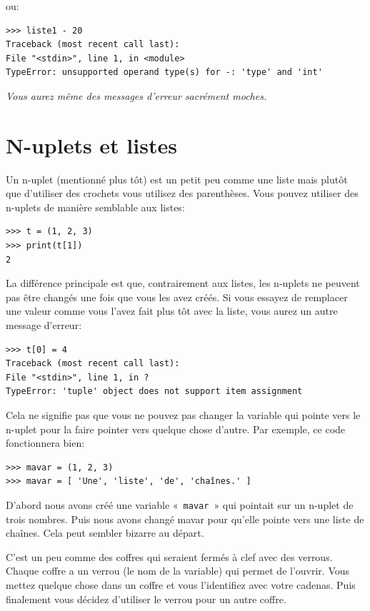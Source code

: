 ou:

\begin{Verbatim}[frame=single,rulecolor=\color{red}, label=erreur]
>>> liste1 - 20
Traceback (most recent call last):
File "<stdin>", line 1, in <module>
TypeError: unsupported operand type(s) for -: 'type' and 'int'
\end{Verbatim}

\emph{Vous aurez même des messages d'erreur sacrément moches.}

\section{N-uplets et listes\label{sec:nuplets}}
Un n-uplet (mentionné plus tôt) est un petit peu comme une liste mais plutôt que d'utiliser des crochets vous utilisez des parenthèses. Vous pouvez utiliser des n-uplets de manière semblable aux listes:

\begin{Verbatim}[frame=single,rulecolor=\color{mbleu}, label=à taper]
>>> t = (1, 2, 3)
>>> print(t[1])
2
\end{Verbatim}

La différence principale est que, contrairement aux listes, les n-uplets ne peuvent pas être changés une fois que vous les avez créés. Si vous essayez de remplacer une valeur comme vous l'avez fait plus tôt avec la liste, vous aurez un autre message d'erreur:

\begin{Verbatim}[frame=single,rulecolor=\color{red}, label=erreur]
>>> t[0] = 4
Traceback (most recent call last):
File "<stdin>", line 1, in ?
TypeError: 'tuple' object does not support item assignment
\end{Verbatim}

Cela ne signifie pas que vous ne pouvez pas changer la variable qui pointe vers le n-uplet pour la faire pointer vers quelque chose d'autre. Par exemple, ce code fonctionnera bien:

\begin{Verbatim}[frame=single,rulecolor=\color{mbleu}, label=à taper]
>>> mavar = (1, 2, 3)
>>> mavar = [ 'Une', 'liste', 'de', 'chaînes.' ]
\end{Verbatim}

D'abord nous avons créé une variable «~\texttt{mavar}~» qui pointait sur un n-uplet de trois nombres. Puis nous avons changé mavar pour qu'elle pointe vers une liste de chaînes. Cela peut sembler bizarre au départ.

C'est un peu comme des coffres qui seraient fermés à clef avec des verrous. Chaque coffre a un verrou  (le nom de la variable) qui permet de l'ouvrir. Vous mettez quelque chose dans un coffre et vous l'identifiez avec votre cadenas. Puis finalement vous décidez d'utiliser le verrou  pour un autre coffre. 

